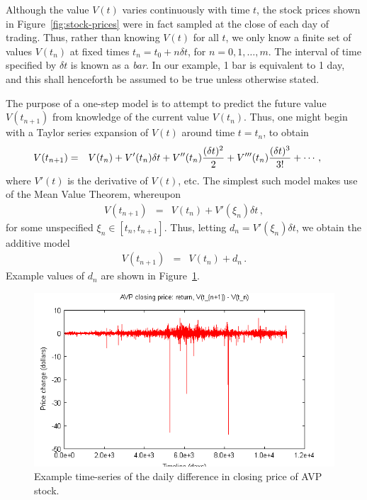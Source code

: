 \documentclass[a4paper]{book}
\begin{document}
Although the value $V(t)$ varies continuously with time $t$,
the stock prices shown in Figure~\ref{fig:stock-prices} were in
fact sampled at the close of each day of trading.
Thus, rather than knowing $V(t)$ for all $t$, we only know
a finite set of values $V(t_n)$ at fixed times $t_n=t_0+n\delta t$,
for $n=0,1,\ldots,m$. The interval of time specified by $\delta t$
is known as a {\em bar}. In our example,
1 bar is equivalent to 1 day, and this shall henceforth 
be assumed to be true unless otherwise stated.

The purpose of a one-step model is to attempt to predict
the future value $V(t_{n+1})$ 
from knowledge of the current value
$V(t_n)$. Thus, one might begin with a Taylor series expansion
of $V(t)$ around time $t=t_{n}$, to obtain
\begin{eqnarray}
\hspace*{-5mm}V(t_{n+1}) & = & V(t_{n})+V'(t_{n})\delta t
+V''(t_{n})\frac{(\delta t)^2}{2}
+V'''(t_{n})\frac{(\delta t)^3}{3!}
+\cdots\,,
\label{eq:Taylor-V}
\end{eqnarray}
where $V'(t)$ is the derivative of $V(t)$, etc.
The simplest such model makes use of the Mean Value Theorem,
whereupon
\begin{eqnarray}
V(t_{n+1}) & = & V(t_{n})+V'(\xi_{n})\delta t\,,
\label{eq:simple-additive}
\end{eqnarray}
for some unspecified $\xi_n\in[t_{n},t_{n+1}]$.
Thus, letting $d_n=V'(\xi_{n})\delta t$, we obtain the
additive model
\begin{eqnarray}
V(t_{n+1})  & = & V(t_{n}) + d_n\,.
\end{eqnarray}
Example values of $d_n$ are shown in Figure~\ref{fig:avp-price-diff}.
\begin{figure}[hbt]
\includegraphics[scale=0.8]{figures/avp-price-close-diff.png}
\caption{Example time-series of the daily difference in closing price
of AVP stock.}
\label{fig:avp-price-diff}
\end{figure}
\end{document}
